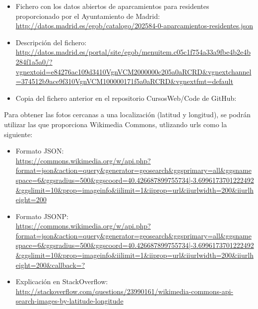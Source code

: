 \begin{itemize}

  \item Fichero con los datos abiertos de aparcamientos para residentes proporcionado por el Ayuntamiento de Madrid: \\
    \url{http://datos.madrid.es/egob/catalogo/202584-0-aparcamientos-residentes.json}

  \item Descripción del fichero: \\
    \url{http://datos.madrid.es/portal/site/egob/menuitem.c05c1f754a33a9fbe4b2e4b284f1a5a0/?vgnextoid=e84276ac109d3410VgnVCM2000000c205a0aRCRD&vgnextchannel=374512b9ace9f310VgnVCM100000171f5a0aRCRD&vgnextfmt=default}
      
  \item Copia del fichero anterior en el repositorio CursosWeb/Code de GitHub: \\
\end{itemize}

Para obtener las fotos cercanas a una localización (latitud y longitud), se podrán utilizar las que proporciona Wikimedia Commons, utlizando urls como la siguiente:

\begin{itemize}
\item Formato JSON: \\
  \url{https://commons.wikimedia.org/w/api.php?format=json&action=query&generator=geosearch&ggsprimary=all&ggsnamespace=6&ggsradius=500&ggscoord=40.426687899755734|-3.6996173701222492&ggslimit=10&prop=imageinfo&iilimit=1&iiprop=url&iiurlwidth=200&iiurlheight=200}
\item Formato JSONP: \\
  \url{https://commons.wikimedia.org/w/api.php?format=json&action=query&generator=geosearch&ggsprimary=all&ggsnamespace=6&ggsradius=500&ggscoord=40.426687899755734|-3.6996173701222492&ggslimit=10&prop=imageinfo&iilimit=1&iiprop=url&iiurlwidth=200&iiurlheight=200&callback=?}
\item Explicación en StackOverflow: \\
  \url{http://stackoverflow.com/questions/23990161/wikimedia-commons-api-search-images-by-latitude-longitude}
\end{itemize}

